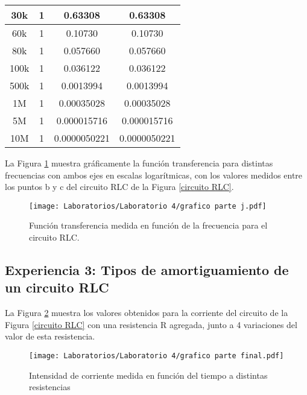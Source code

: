 \documentclass[letterpaper,11pt]{article} %
\begin{document}
\begin{center}
\begin{tabular}{|c|c|c|c|}
30k                          & 1                         & 0.63308                    & 0.63308              \\ \hline
60k                          & 1                         & 0.10730                    & 0.10730              \\ \hline
80k                          & 1                         & 0.057660                   & 0.057660             \\ \hline
100k                         & 1                         & 0.036122                   & 0.036122             \\ \hline
500k                         & 1                         & 0.0013994                  & 0.0013994            \\ \hline
1M                           & 1                         & 0.00035028                 & 0.00035028           \\ \hline
5M                           & 1                         & 0.000015716                & 0.000015716          \\ \hline
10M                          & 1                         & 0.0000050221               & 0.0000050221         \\ \hline
\end{tabular}
\end{center}

La Figura \ref{parte j} muestra gráficamente la función transferencia para distintas frecuencias con ambos ejes en escalas logarítmicas, con los valores medidos entre los puntos b y c del circuito RLC de la Figura \ref{circuito RLC}.
\begin{figure}
    \centering
    \texttt{[image: Laboratorios/Laboratorio 4/grafico parte j.pdf]}
    \caption{Función transferencia medida en función de la frecuencia para el circuito RLC.}
    \label{parte j}
\end{figure}



\subsection{Experiencia 3: Tipos de amortiguamiento de un circuito RLC}
La Figura \ref{parte final} muestra los valores obtenidos para la corriente del circuito de la Figura \ref{circuito RLC} con una resistencia R agregada, junto a 4 variaciones del valor de esta resistencia.
\begin{figure}
    \centering
    \texttt{[image: Laboratorios/Laboratorio 4/grafico parte final.pdf]}
    \caption{Intensidad de corriente medida en función del tiempo a distintas resistencias}
    \label{parte final}
\end{figure}
\end{document}
